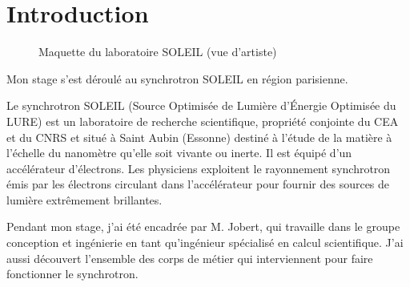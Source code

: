 



			
\chapter*{Introduction}
\minitoc
\begin{figure}
  \centering
  \caption{Maquette du laboratoire SOLEIL (vue d'artiste)}
\end{figure}

     Mon stage s'est déroulé au synchrotron SOLEIL en région parisienne. 



		
     Le synchrotron SOLEIL (Source Optimisée de Lumière d'Énergie Optimisée du LURE) est un laboratoire de recherche scientifique, propriété conjointe du CEA et du CNRS et situé à Saint Aubin (Essonne) destiné à l'étude de la matière à l'échelle du nanomètre qu'elle soit vivante ou inerte. Il est équipé d'un accélérateur d'électrons. Les physiciens exploitent le rayonnement synchrotron émis par les électrons circulant dans l'accélérateur pour fournir des sources de lumière extrêmement brillantes.

     Pendant mon stage, j'ai été encadrée par M. Jobert, qui travaille dans le groupe conception et ingénierie en tant qu'ingénieur spécialisé en calcul scientifique. J'ai aussi découvert l'ensemble des corps de métier qui interviennent pour faire fonctionner le synchrotron.
		
